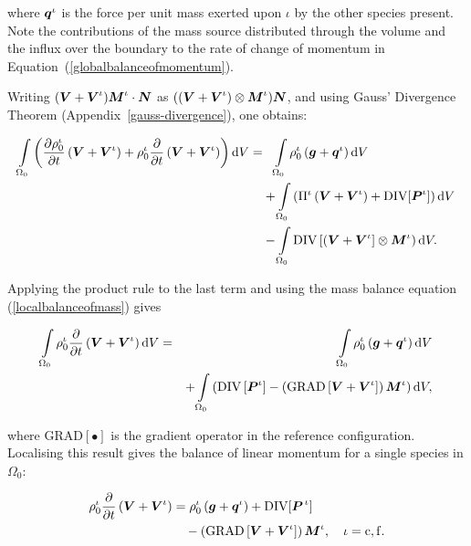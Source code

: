 \noindent where $\mbox{\boldmath$ q$}^\iota$ is the force per unit mass exerted upon
$\iota$ by the other species present. Note the contributions of the
mass source distributed through the volume and the influx over the
boundary to the rate of change of momentum in
Equation~(\ref{globalbalanceofmomentum}).

Writing $(\mbox{\boldmath$ V$}+\mbox{\boldmath$ V$}^\iota) \mbox{\boldmath$ M$}^\iota\cdot\mbox{\boldmath$ N$}$ as
$((\mbox{\boldmath$ V$}+\mbox{\boldmath$ V$}^\iota)\otimes\mbox{\boldmath$ M$}^\iota)\mbox{\boldmath$ N$}$, and using Gauss' Divergence
Theorem (Appendix~\ref{gauss-divergence}), one obtains:

\begin{equation*}
\begin{split}
\int\limits_{\Omega_0} \left(\frac{\partial\rho_0^\iota}{\partial
  t}\left(\mbox{\boldmath$ V$}+\mbox{\boldmath$ V$}^\iota\right) + \rho_0^\iota\frac{\partial}{\partial
  t}\left(\mbox{\boldmath$ V$}+\mbox{\boldmath$ V$}^\iota\right)\right) \mathrm{d}V = & \phantom{+}
\int\limits_{\Omega_0}\rho^\iota_0\left(\mbox{\boldmath$ g$}+\mbox{\boldmath$ q$}^\iota\right)
\mathrm{d}V \qquad \\ &
+\int\limits_{\Omega_0}\left(\Pi^\iota\left(\mbox{\boldmath$ V$}+\mbox{\boldmath$ V$}^\iota\right) +
\mathrm{DIV}[\mbox{\boldmath$ P$}^\iota]\right) \mathrm{d}V \\ & -
\int\limits_{\Omega_0}\mathrm{DIV}
\left[\left(\mbox{\boldmath$ V$}+\mbox{\boldmath$ V$}^\iota\right]\otimes\mbox{\boldmath$ M$}^\iota\right)\mathrm{d}V .
\end{split}
\end{equation*}

\noindent Applying the product rule to the last term and using the
mass balance equation (\ref{localbalanceofmass}) gives

\begin{eqnarray}
\int\limits_{\Omega_0} \rho_0^\iota\frac{\partial}{\partial
  t}\left(\mbox{\boldmath$ V$}+\mbox{\boldmath$ V$}^\iota\right) \mathrm{d}V &=&
\int\limits_{\Omega_0}\rho^\iota_0\left(\mbox{\boldmath$ g$}+\mbox{\boldmath$ q$}^\iota\right)
\mathrm{d}V \nonumber\\ & &+
\int\limits_{\Omega_0}\left(\mathrm{DIV}\left[\mbox{\boldmath$ P$}^\iota\right] -
\left(\mathrm{GRAD}\left[\mbox{\boldmath$ V$}+\mbox{\boldmath$ V$}^\iota\right]\right)\mbox{\boldmath$ M$}^\iota\right)
\mathrm{d}V, \nonumber
\end{eqnarray}

\noindent where $\mathrm{{GRAD}[\bullet]}$ is the gradient operator in
the reference configuration. Localising this result gives the balance
of linear momentum for a single species in $\Omega_{0}$:

\begin{equation}
\begin{split}
\rho_0^\iota\frac{\partial}{\partial t}\left(\mbox{\boldmath$ V$}+\mbox{\boldmath$ V$}^\iota\right) &
=\rho^\iota_0\left(\mbox{\boldmath$ g$}+\mbox{\boldmath$ q$}^\iota\right) +
\mathrm{DIV}[\mbox{\boldmath$ P$}^{\,\iota}]\\ & \quad -\left(\mathrm{GRAD}\left[\mbox{\boldmath$ V$}+
  \mbox{\boldmath$ V$}^\iota\right]\right)\mbox{\boldmath$ M$}^\iota, \quad \iota = \mathrm{c,f}.
\label{localbalanceofmomentum}
\end{split}
\end{equation} 

